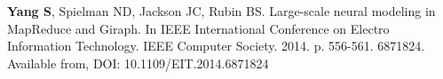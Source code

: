 

\begin{cvpubs}

  \cvpub
    {\textbf{Yang S}, Spielman ND, Jackson JC, Rubin BS. Large-scale neural
    modeling in MapReduce and Giraph. In IEEE International Conference
    on Electro Information Technology. IEEE Computer
    Society. 2014. p. 556-561. 6871824. Available from, DOI:
    10.1109/EIT.2014.6871824}

\end{cvpubs}
